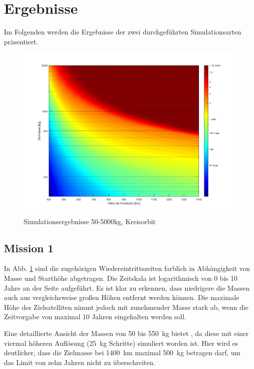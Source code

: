

\section{Ergebnisse}

	Im Folgenden werden die Ergebnisse der zwei durchgeführten Simulationsarten präsentiert.
\begin{figure}[h]
\centering
\includegraphics[width=1.00\textwidth]{./graphics/GMAT/GMAT_Mass_over_Height.png}
\caption{Simulationsergebnisse 50-5000kg, Kreisorbit}
\label{fig:GMAT_Mass_over_Height}
\end{figure}

\subsection{Mission 1}

	In Abb. \ref{fig:GMAT_Mass_over_Height} sind die zugehörigen Wiedereintrittszeiten farblich in Abhängigkeit von Masse und Starthöhe abgetragen. Die Zeitskala ist logarithmisch von \num{0} bis \num{10} Jahre an der Seite aufgeführt.  
Es ist klar zu erkennen, dass niedrigere die Massen auch aus vergleichsweise großen Höhen entfernt werden können. Die maximale Höhe des Zielsatelliten nimmt jedoch mit zunehmender Masse stark ab, wenn die Zeitvorgabe von maximal \num{10} Jahren eingehalten werden soll.

	Eine detaillierte Ansicht der Massen von \num{50} bis \SI{550}{\kilogram} bietet , da diese mit einer viermal höheren Auflösung (\SI{25}{\kilogram} Schritte) simuliert worden ist. Hier wird es deutlicher, dass die Zielmasse bei \SI{1400}{\kilo\metre} maximal \SI{500}{\kilogram} betragen darf, um das Limit von zehn Jahren nicht zu überschreiten.


